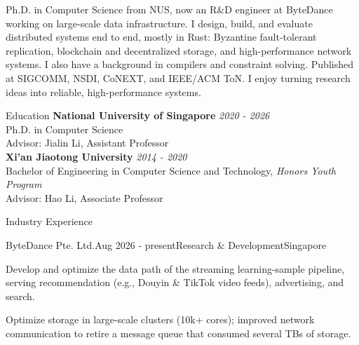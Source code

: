 \documentclass[
]{resume} %
\begin{document}
Ph.D. in Computer Science from NUS, now an R\&D engineer at ByteDance working on large-scale data infrastructure.
I design, build, and evaluate distributed systems end to end, mostly in Rust:
Byzantine fault-tolerant replication, blockchain and decentralized storage, and high-performance network systems.
I also have a background in compilers and constraint solving.
Published at SIGCOMM, NSDI, CoNEXT, and IEEE/ACM ToN.
I enjoy turning research ideas into reliable, high-performance systems.

\begin{rSection}{Education}
    \textbf{National University of Singapore} \hfill {\em 2020 - 2026} \\
    Ph.D. in Computer Science \\
    Advisor: Jialin Li, Assistant Professor \\

    \textbf{Xi'an Jiaotong University}  \hfill {\em 2014 - 2020} \\
    Bachelor of Engineering in Computer Science and Technology, \emph{Honors Youth Program} \\
    Advisor: Hao Li, Associate Professor
\end{rSection}

\begin{rSection}{Industry Experience}
    \begin{rSubsection}{ByteDance Pte. Ltd.}{Aug 2026 - present}{Research \& Development}{Singapore}
        \item Develop and optimize the data path of the streaming learning-sample pipeline, serving recommendation (e.g., Douyin \& TikTok video feeds), advertising, and search.
        \item Optimize storage in large-scale clusters (10k+ cores); improved network communication to retire a message queue that consumed several TBs of storage.
    \end{rSubsection}
\end{rSection}
\end{document}
